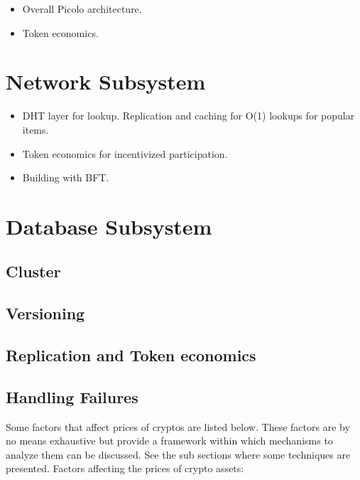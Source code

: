 \documentclass[a4paper]{article}
\begin{document}
    \begin{itemize}
        \item Overall Picolo architecture.
        \item Token economics.
    \end{itemize}
\section{Network Subsystem}

    \begin{itemize}
        \item DHT layer for lookup. Replication and caching for O(1) lookups for popular items.
        \item Token economics for incentivized participation.
        \item Building with BFT.
    \end{itemize}
\section{Database Subsystem}

\subsection{Cluster}
\subsection{Versioning}
\subsection{Replication and Token economics}
\subsection{Handling Failures}

Some factors that affect prices of cryptos are listed below. These factors are by no means exhaustive but provide a framework within which mechanisms to analyze them can be discussed. See the sub sections where some techniques are presented.
Factors affecting the prices of crypto assets:
\end{document}
